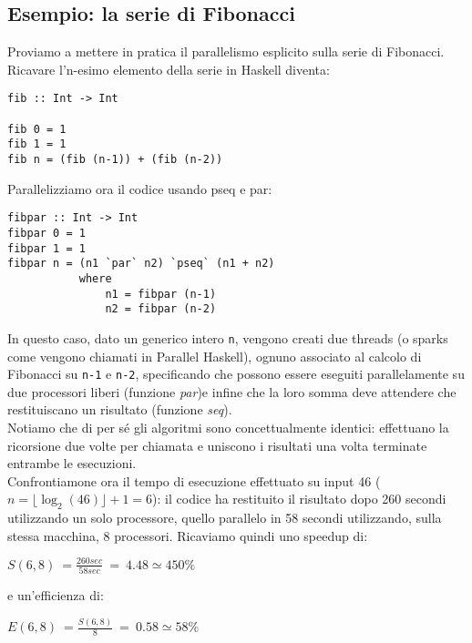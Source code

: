 \subsection{Esempio: la serie di Fibonacci}
Proviamo a mettere in pratica il parallelismo esplicito sulla serie di Fibonacci. Ricavare l'n-esimo elemento della serie in Haskell diventa:
\begin{verbatim}
fib :: Int -> Int

fib 0 = 1
fib 1 = 1
fib n = (fib (n-1)) + (fib (n-2))
\end{verbatim}
Parallelizziamo ora il codice usando pseq e par:
\begin{verbatim}
fibpar :: Int -> Int
fibpar 0 = 1
fibpar 1 = 1
fibpar n = (n1 `par` n2) `pseq` (n1 + n2)
           where
               n1 = fibpar (n-1)
               n2 = fibpar (n-2)
\end{verbatim}
In questo caso, dato un generico intero \texttt{n}, vengono creati due threads (o sparks come vengono chiamati in Parallel Haskell), ognuno associato al calcolo di Fibonacci su \texttt{n-1} e \texttt{n-2}, specificando che possono essere eseguiti parallelamente su due processori liberi (funzione \textit{par})e infine che la loro somma deve attendere che restituiscano un risultato (funzione \textit{seq}).\\
Notiamo che  di per sé gli algoritmi sono concettualmente identici: effettuano la ricorsione due volte per chiamata e uniscono i risultati una volta terminate entrambe le esecuzioni.\\
Confrontiamone ora il tempo di esecuzione effettuato su input 46 ($n = \lfloor \log_2(46) \rfloor + 1 = 6$): il codice ha restituito il risultato dopo 260 secondi utilizzando un solo processore, quello parallelo in 58 secondi utilizzando, sulla stessa macchina, 8 processori. Ricaviamo quindi uno speedup di:
\begin{center}
$S(6,8) \ = \frac{260 sec}{58 sec} \ = \ 4.48 \simeq 450 \%$
\end{center} 
e un'efficienza di:
\begin{center}
$E(6,8) \ = \frac{S(6,8)}{8} \ = \ 0.58 \simeq 58 \%$
\end{center}
\newpage
